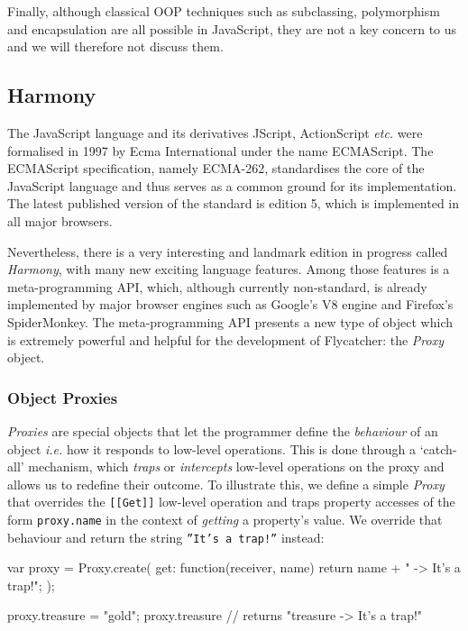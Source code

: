 Finally, although classical OOP techniques such as subclassing, polymorphism and encapsulation are all possible in JavaScript, they are not a key concern to us and we will therefore not discuss them.

\subsection{Harmony}
The JavaScript language and its derivatives JScript, ActionScript \emph{etc.} were formalised in 1997 by Ecma International under the name ECMAScript. The ECMAScript specification, namely ECMA-262, standardises the core of the JavaScript language and thus serves as a common ground for its implementation. The latest published version of the standard is edition 5, which is implemented in all major browsers.

Nevertheless, there is a very interesting and landmark edition in progress called \emph{Harmony}, with many new exciting language features. Among those features is a meta-programming API, which, although currently non-standard, is already implemented by major browser engines such as Google's V8 engine and Firefox's SpiderMonkey. The meta-programming API presents a new type of object which is extremely powerful and helpful for the development of \textsf{Flycatcher}: the \emph{Proxy} object.

\subsubsection{Object Proxies}
\emph{Proxies} are special objects that let the programmer define the \emph{behaviour} of an object \emph{i.e.} how it responds to low-level operations. This is done through a `catch-all' mechanism, which \emph{traps} or \emph{intercepts} low-level operations on the proxy and allows us to redefine their outcome. To illustrate this, we define a simple \emph{Proxy} that overrides the \texttt{[[Get]]} low-level operation and traps property accesses of the form \texttt{proxy.name} in the context of \emph{getting} a property's value. We override that behaviour and return the string \texttt{''It's a trap!''} instead:

\begin{code}[caption=Object Proxy,label=objproxy]
var proxy = Proxy.create({
  get: function(receiver, name) {
    return name + " -> It's a trap!";
  }
});

proxy.treasure = "gold";
proxy.treasure // returns "treasure -> It's a trap!"
\end{code}


